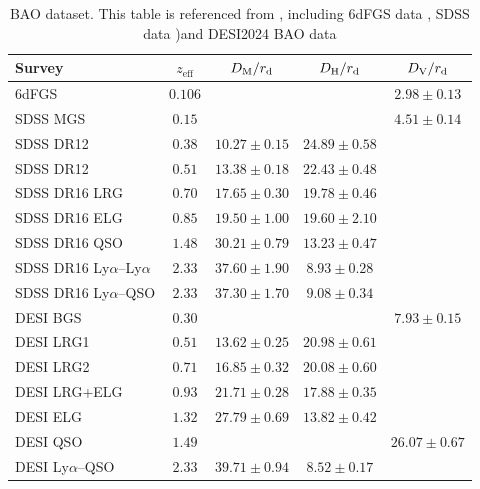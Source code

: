 \documentclass[a4paper,fleqn]{cas-sc}
\begin{document}
\begin{table}
    \centering
    \begin{center}
    \begin{tabular}{lcccc}
    \hline\hline
    Survey          & $z_\text{eff}$ & $D_{\rm M}/r_{\rm d}$
                                     & $D_{\rm H}/r_{\rm d}$
                                     & $D_{\rm V}/r_{\rm d}$\\
    \hline
    6dFGS		    & $0.106$	& & & $2.98\pm0.13$ \\
    \hline
    SDSS MGS 		& $0.15$	& & & $4.51\pm0.14$ \\
    SDSS DR12		& $0.38$    & $10.27\pm0.15$
                                & $24.89\pm 0.58$ & \\
    SDSS DR12		& $0.51$    & $13.38\pm0.18$
                                & $22.43\pm 0.48$ & \\
    SDSS DR16 LRG	& $0.70$    & $17.65\pm0.30$
                                & $19.78\pm0.46$ & \\
    SDSS DR16 ELG	& $0.85$	& $19.50\pm1.00$
                                & $19.60\pm2.10$ & \\
    SDSS DR16 QSO	& $1.48$    & $30.21\pm0.79$
                                & $13.23\pm0.47$ & \\
    SDSS DR16 Ly$\alpha$--Ly$\alpha$
                    & $2.33$    & $37.60\pm1.90$
                                & $8.93\pm0.28$ & \\
    SDSS DR16 Ly$\alpha$--QSO	
                    & $2.33$    & $37.30\pm1.70$
                                & $9.08\pm0.34$ & \\
    \hline
    DESI BGS 		& $0.30$    & & & $7.93\pm0.15$ \\
    DESI LRG1	 	& $0.51$ 	& $13.62\pm0.25$
                                & $20.98\pm0.61$ & \\
    DESI LRG2       & $0.71$ 	& $16.85\pm0.32$
                                & $20.08\pm0.60 $& \\
    DESI LRG+ELG    & $0.93$    & $21.71\pm0.28$
                                & $17.88\pm0.35$ & \\
    DESI ELG        & $1.32$    & $27.79\pm0.69$
                                & $13.82\pm0.42$ & \\
    DESI QSO		& $1.49$	& & & $26.07\pm0.67$ \\
    DESI Ly$\alpha$--QSO
                    & $2.33$ 	& $39.71\pm0.94$
                                & $8.52\pm0.17$ & \\
    \hline
    \end{tabular}
    \end{center}
    \caption{BAO dataset. This table is referenced from \cite{luongoDarkEnergyReconstructions2024}, including 6dFGS data \cite{Beutler_2011}, SDSS data \cite{PhysRevD.103.083533})and DESI2024 BAO data \cite{desicollaboration2024desi2024vicosmological}}
    \label{tab:baodata}
\end{table}
\end{document}
